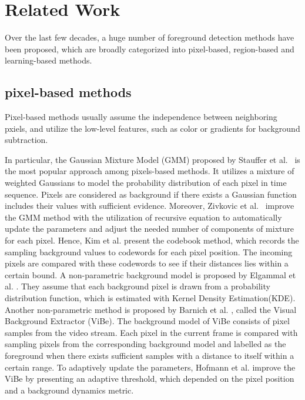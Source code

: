 \documentclass[journal]{IEEEtran}
\begin{document}
\section{Related Work}
\label{sec2}
Over the last few decades, a huge number of foreground detection methods have been proposed,
which are broadly categorized into pixel-based, region-based and learning-based methods.
\subsection{pixel-based methods}
Pixel-based methods usually assume the independence between neighboring pxiels,
and utilize the low-level features, such as color or gradients for background subtraction.

In particular, the Gaussian Mixture Model (GMM) proposed by Stauffer et al.\ \cite{Stauffer1999} is the most popular approach among pixels-based methods.
It utilizes a mixture of weighted Gaussians to model the probability distribution of each pixel in time sequence.
Pixels are considered as background if there exists a Gaussian function includes their values with sufficient evidence. 
Moreover,
Zivkovic et al.\ \cite{Zivkovic2004} improve the GMM method with the utilization of recursive equation
to automatically update the parameters and adjust the needed number of components of mixture for each pixel. 
%
Hence, Kim et al.\cite{Kim2005} present the codebook method, which records the sampling background values to codewords for each pixel position.
The incoming pixels are compared with these codewords to see if their distances lies within a certain bound. 
A non-parametric background model is proposed by Elgammal et al. \cite{Elgammal2000Non}. 
They assume that each background pixel is drawn from a probability distribution function, which is estimated with Kernel Density Estimation(KDE). 
Another non-parametric method is proposed by Barnich et al. \cite{Barnich2011_2011_TIP}, called the Visual Background Extractor (ViBe). The background model of ViBe consists of pixel samples from the video stream. Each pixel in the current frame is compared with sampling pixels from the corresponding background model and labelled as the foreground when there exists sufficient samples with a distance to itself within a certain range. 
To adaptively update the parameters, Hofmann et al.\cite{Hofmann2012Background} improve the ViBe by presenting an adaptive threshold, which depended on the pixel position and a background dynamics metric.
\end{document}
